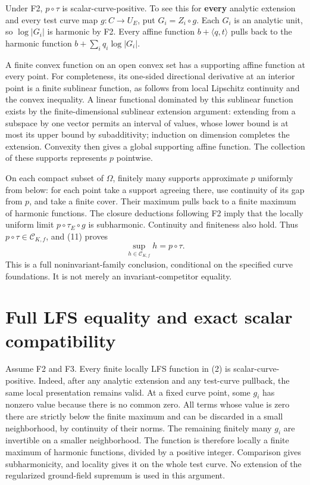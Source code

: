\documentclass[11pt]{article}
\begin{document}
Under F2, \(p\circ\tau\) is scalar-curve-positive. To see this for \textbf{every} analytic extension and every test curve map \(g:C\to U_E\), put \(G_i=Z_i\circ g\). Each \(G_i\) is an analytic unit, so \(\log|G_i|\) is harmonic by F2. Every affine function \(b+\langle q,t\rangle\) pulls back to the harmonic function \(b+\sum_i q_i\log|G_i|\).

A finite convex function on an open convex set has a supporting affine function at every point. For completeness, its one-sided directional derivative at an interior point is a finite sublinear function, as follows from local Lipschitz continuity and the convex inequality. A linear functional dominated by this sublinear function exists by the finite-dimensional sublinear extension argument: extending from a subspace by one vector permits an interval of values, whose lower bound is at most its upper bound by subadditivity; induction on dimension completes the extension. Convexity then gives a global supporting affine function. The collection of these supports represents \(p\) pointwise.

On each compact subset of \(\Omega\), finitely many supports approximate \(p\) uniformly from below: for each point take a support agreeing there, use continuity of its gap from \(p\), and take a finite cover. Their maximum pulls back to a finite maximum of harmonic functions. The closure deductions following F2 imply that the locally uniform limit \(p\circ\tau_E\circ g\) is subharmonic. Continuity and finiteness also hold. Thus \(p\circ\tau\in\mathcal C_{K,f}\), and (11) proves
\[
\boxed{\sup_{h\in\mathcal C_{K,f}}h=p\circ\tau.}
\tag{12}
\]
This is a full noninvariant-family conclusion, conditional on the specified curve foundations. It is not merely an invariant-competitor equality.

\section{Full LFS equality and exact scalar compatibility}

Assume F2 and F3. Every finite locally LFS function in (2) is scalar-curve-positive. Indeed, after any analytic extension and any test-curve pullback, the same local presentation remains valid. At a fixed curve point, some \(g_i\) has nonzero value because there is no common zero. All terms whose value is zero there are strictly below the finite maximum and can be discarded in a small neighborhood, by continuity of their norms. The remaining finitely many \(g_i\) are invertible on a smaller neighborhood. The function is therefore locally a finite maximum of harmonic functions, divided by a positive integer. Comparison gives subharmonicity, and locality gives it on the whole test curve. No extension of the regularized ground-field supremum is used in this argument.
\end{document}
